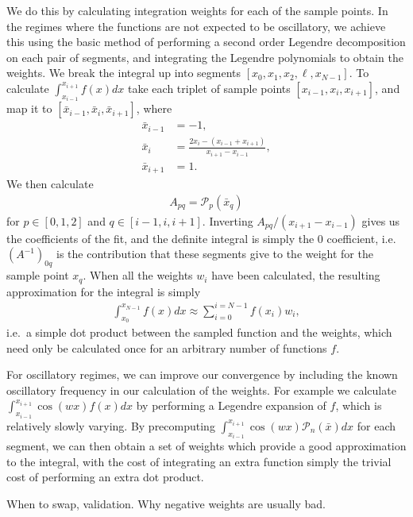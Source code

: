     We do this by calculating integration weights for each of the sample points.
    In the regimes where the functions are not expected to be oscillatory, we achieve this
    using the basic method of performing a second order Legendre decomposition on each pair
    of segments, and integrating the Legendre polynomials to obtain the weights.
    We break the integral up into segments $[x_0, x_1, x_2,\ell,x_{N-1}]$.
    To calculate $\int_{x_{i-1}}^{x_{i+1}}f(x)dx$ take each triplet of
    sample points $[x_{i-1}, x_{i}, x_{i+1}]$, and map it to $[\bar{x}_{i-1}, \bar{x}_{i}, \bar{x}_{i+1}]$,
    where
    \begin{align}
        \bar{x}_{i-1} &= -1,\\
        \bar{x}_i     &= \frac{2x_i-(x_{i-1}+x_{i+1})}{x_{i+1}-x_{i-1}},\\
        \bar{x}_{i+1} &= 1.
    \end{align}
    We then calculate
    \begin{align}
        A_{pq} = \mathcal{P}_p(\bar{x}_q)
    \end{align}
    for $p\in[0,1,2]$ and $q\in[i-1,i,i+1]$.
    Inverting $A_{pq}/(x_{i+1}-x_{i-1})$ gives us the coefficients of the
    fit, and the definite integral is simply the $0$ coefficient,
    i.e.\ $\left(A^{-1}\right)_{0q}$ is the contribution that these segments give to
    the weight for the sample point $x_q$. When all the weights $w_i$ have been calculated,
    the resulting approximation for the integral is simply
    \begin{align}
        \int_{x_{0}}^{x_{N-1}}f(x)dx\approx\sum_{i=0}^{i=N-1}f(x_i)w_i,
    \end{align}
    i.e.\ a simple dot product between the sampled function and the weights,
    which need only be calculated once for an arbitrary number of functions $f$.


    For oscillatory regimes, we can improve our convergence by including the known
    oscillatory frequency in our calculation of the weights. For example we calculate
    $\int_{x_{i-1}}^{x_{i+1}}\cos(wx)f(x)dx$ by performing a Legendre expansion of
    $f$, which is relatively slowly varying. By precomputing $\int_{x_{i-1}}^{x_{i+1}}\cos(wx)\mathcal{P}_n(\bar{x})dx$
    for each segment, we can then obtain a set of weights which provide a good approximation
    to the integral, with the cost of integrating an extra function simply
    the trivial cost of performing an extra dot product.


    When to swap, validation.
    Why negative weights are usually bad.
